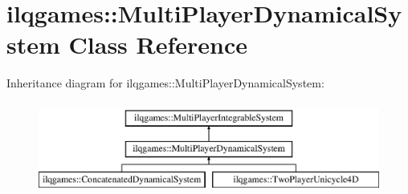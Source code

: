 \hypertarget{classilqgames_1_1_multi_player_dynamical_system}{}\section{ilqgames\+:\+:Multi\+Player\+Dynamical\+System Class Reference}
\label{classilqgames_1_1_multi_player_dynamical_system}
Inheritance diagram for ilqgames\+:\+:Multi\+Player\+Dynamical\+System\+:\begin{figure}[H]
\begin{center}
\leavevmode
\includegraphics[height=3.000000cm]{classilqgames_1_1_multi_player_dynamical_system}
\end{center}
\end{figure}
